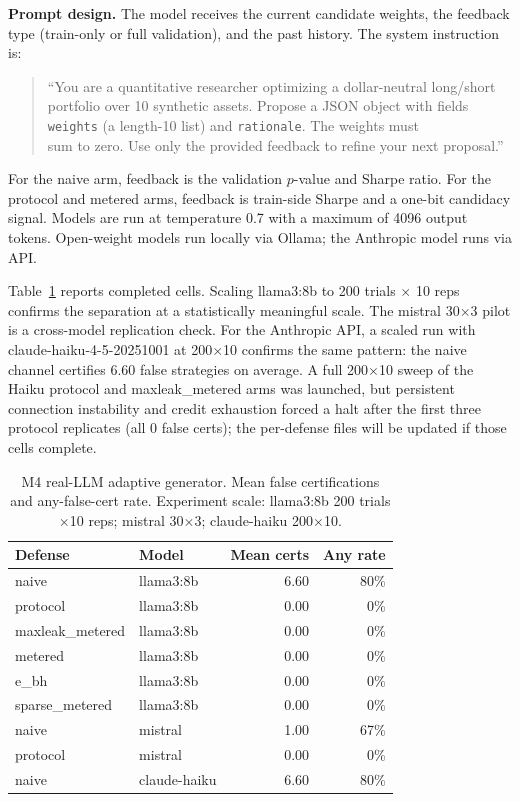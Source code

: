 \documentclass[sigconf]{acmart}
\theoremstyle{plain}
\begin{document}
\textbf{Prompt design.} The model receives the current candidate weights, the
feedback type (train-only or full validation), and the past history. The system
instruction is:
\begin{quote}
\footnotesize
``You are a quantitative researcher optimizing a dollar-neutral long/short\\
portfolio over 10 synthetic assets. Propose a JSON object with fields\\
\texttt{weights} (a length-10 list) and \texttt{rationale}. The weights must\\
sum to zero. Use only the provided feedback to refine your next proposal.''
\end{quote}
For the naive arm, feedback is the validation $p$-value and Sharpe ratio. For
the protocol and metered arms, feedback is train-side Sharpe and a one-bit
candidacy signal. Models are run at temperature 0.7 with a maximum of 4096
output tokens. Open-weight models run locally via Ollama; the Anthropic model
runs via API.

Table~\ref{tab:m4} reports completed cells. Scaling llama3:8b to 200 trials
$\times$ 10 reps confirms the separation at a statistically meaningful scale.
The mistral 30$\times$3 pilot is a cross-model replication check. For the
Anthropic API, a scaled run with claude-haiku-4-5-20251001 at 200$\times$10
confirms the same pattern: the naive channel certifies 6.60 false strategies
on average. A full 200$\times$10 sweep of the Haiku protocol and
maxleak\_metered arms was launched, but persistent connection instability and
credit exhaustion forced a halt after the first three protocol replicates (all
0 false certs); the per-defense files will be updated if those cells complete.

\begin{table}[t]
\caption{M4 real-LLM adaptive generator. Mean false certifications and
  any-false-cert rate. Experiment scale: llama3:8b 200 trials$\times$10 reps;
  mistral 30$\times$3; claude-haiku 200$\times$10.}
\label{tab:m4}
\footnotesize
\begin{tabular}{@{}>{\raggedright\arraybackslash}p{1.8cm}@{}>{\raggedright\arraybackslash}p{1.5cm}@{}rr@{}}
\toprule
Defense & Model & Mean certs & Any rate \\
\midrule
naive & llama3:8b & 6.60 & 80\% \\
protocol & llama3:8b & 0.00 & 0\% \\
maxleak\_metered & llama3:8b & 0.00 & 0\% \\
metered & llama3:8b & 0.00 & 0\% \\
e\_bh & llama3:8b & 0.00 & 0\% \\
sparse\_metered & llama3:8b & 0.00 & 0\% \\
naive & mistral & 1.00 & 67\% \\
protocol & mistral & 0.00 & 0\% \\
naive & claude-haiku & 6.60 & 80\% \\
\bottomrule
\end{tabular}
\end{table}
\end{document}
